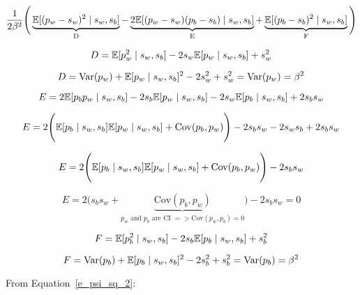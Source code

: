 \documentclass[a4paper,11pt]{article}
\theoremstyle{mytheor}
\newcommand{\E}{\Bbb{E}}
\newcommand{\Var}{\mathrm{Var}}
\newcommand{\Cov}{\mathrm{Cov}}
\begin{document}
\begin{equation}
    \label{e_psi_sq_2}
    \frac{1}{2\beta^2} \Bigg( \underbrace{\Bbb{E}[(p_w-s_w)^2\mid s_w,s_b]}_\text{D} - \underbrace{2\Bbb{E}[(p_w-s_w)(p_b-s_b)\mid s_w,s_b]}_\text{E} + \underbrace{\Bbb{E}[(p_b-s_b)^2\mid s_w,s_b]}_\text{F} \Bigg)
\end{equation}

\begin{equation}
    \label{e_psi_sq_2_a}
    D=\Bbb{E}[p_w^2\mid s_w,s_b] - 2s_w\Bbb{E}[p_w\mid s_w,s_b] + s_{w}^{2}
\end{equation}

\begin{equation}
    \label{e_psi_sq_2_a_1}
    D=\Var(p_w)+\E[p_w\mid s_w,s_b]^2 - 2s_w^2 + s_{w}^{2} = \Var(p_w) = \beta^2
\end{equation}

\begin{equation}
    \label{e_psi_sq_2_b}
    E=2\E[p_bp_w \mid s_w,s_b] - 2s_b\E[p_w \mid s_w,s_b] - 2s_w\E[p_b \mid s_w,s_b] + 2s_bs_w
\end{equation}

\begin{equation}
    \label{e_psi_sq_2_b_1}
    E=2 \Bigg( \E[p_b \mid s_w,s_b]\E[p_w \mid s_w,s_b] + \Cov(p_b,p_w) \Bigg) - 2s_bs_w - 2s_ws_b + 2s_bs_w
\end{equation}

\begin{equation}
    \label{e_psi_sq_2_b_2}
    E=2 \Bigg( \E[p_b \mid s_w,s_b]\E[p_w \mid s_w,s_b] + \Cov(p_b,p_w) \Bigg) - 2s_bs_w
\end{equation}

\begin{equation}
    \label{e_psi_sq_2_b_2}
    E=2 \Bigg( s_b s_w +  \underbrace{\Cov(p_b,p_w)}_\text{$p_w$ and $p_b$ are CI $=> \Cov(p_w,p_b)=0$} \Bigg) - 2s_bs_w=0
\end{equation}

\begin{equation}
    \label{e_psi_sq_2_c}
    F=\Bbb{E}[p_b^2\mid s_w,s_b] - 2s_b\Bbb{E}[p_b\mid s_w,s_b] + s_{b}^{2}
\end{equation}

\begin{equation}
    \label{e_psi_sq_2_c_1}
    F=\Var(p_b)+\E[p_b\mid s_w,s_b]^2 - 2s_b^2 + s_{b}^{2} = \Var(p_b) = \beta^2
\end{equation}

From Equation~\ref{e_psi_sq_2}:
\end{document}
